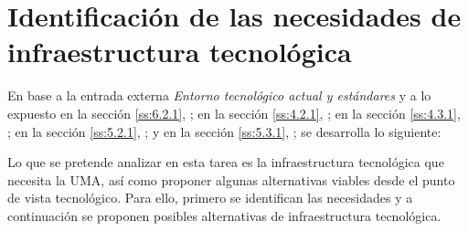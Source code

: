 \documentclass[11pt,a4paper,spanish,twoside]{report}
\begin{document}
\section{Identificación de las necesidades de infraestructura 
  tecnológica}
En base a la entrada externa \emph{Entorno tecnológico actual y estándares} y
a lo expuesto 
en la sección \vref{ss:6.2.1}, \emph{}; 
en la sección \vref{ss:4.2.1}, \emph{}; 
en la sección \vref{ss:4.3.1}, \emph{};
en la sección \vref{ss:5.2.1}, \emph{}; y
en la sección \vref{ss:5.3.1}, \emph{}; 
se desarrolla lo siguiente:

Lo que se pretende analizar en esta tarea es la infraestructura tecnológica
que necesita la UMA, así como proponer algunas alternativas viables desde
el punto de vista tecnológico. Para ello, primero se identifican las
necesidades y a continuación se proponen posibles alternativas de
infraestructura tecnológica. 
\end{document}
